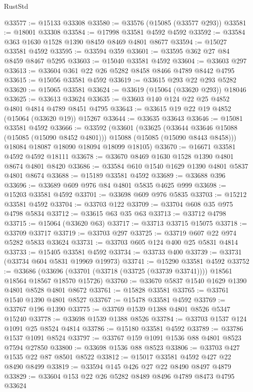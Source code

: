 \begin{lexlean}{RustStd}
\begin{coremodule}
@33577 := @15133 @33308
@33580 := @33576 (@15085 (@33577 @293))
@33581 := @18001 @33308
@33584 := @17998 @33581 @4592 @4592
@33592 := @33584 @363 @1630 @1528 @1390 @8459 @8469 @4801 @8677
@33594 := @15027 @33581 @4592
@33595 := @33594 @359
@33601 := @33595 @362 @27 @84 @8459 @8467 @5295
@33603 := @15040 @33581 @4592
@33604 := @33603 @297
@33613 := @33604 @361 @22 @26 @5282 @8458 @8466 @4789 @8442 @4795
@33615 := @15056 @33581 @4592
@33619 := @33615 @293 @22 @293 @5282
@33620 := @15065 @33581
@33624 := @33619 (@15064 (@33620 @293)) @18046
@33625 := @33613 @33624
@33635 := @33603 @140 @124 @22 @25 @4852 @4801 @4814 @4789 @8451 @4795
@33643 := @33615 @19 @22 @19 @4852 (@15064 (@33620 @19)) @15267
@33644 := @33635 @33643
@33646 := @15081 @33581 @4592
@33666 := @33592
    (@33601
      (@33625
        (@33644 @33646 @15088 (@15085 (@15090 @8452 @4801)))
        @15088
        (@15085 (@15090 @8443 @8458)))
      @18084
      @18087
      @18090
      @18094
      @18099
      @18105)
@33670 := @16671 @33581 @4592 @4592 @18111
@33678 := @33670 @8469 @1630 @1528 @1390 @4801 @8674 @4801 @8420
@33686 := @33584 @610 @1540 @1629 @1390 @4801 @5837 @4801 @8674
@33688 := @15189 @33581 @4592
@33689 := @33688 @396
@33696 := @33689 @609 @976 @84 @4801 @5835 @4625 @999
@33698 := @15203 @33581 @4592
@33701 := @33698 @609 @976 @5835
@33703 := @15212 @33581 @4592
@33704 := @33703 @122
@33709 := @33704 @608 @35 @975 @4798 @5834
@33712 := @33615 @63 @35 @63
@33713 := @33712 @4798
@33715 := @15064 (@33620 @63)
@33717 := @33713 @33715 @15075
@33718 := @33709 @33717
@33719 := @33703 @297
@33725 := @33719 @607 @22 @974 @5282 @5833 @33624
@33731 := @33703 @605 @124 @400 @25 @5831 @4814
@33733 := @15405 @33581 @4592
@33734 := @33733 @400
@33739 := @33731 (@33734 @604 @5831 @19969 @19973)
@33741 := @15290 @33581 @4592
@33752 := @33686
    (@33696 (@33701 (@33718 (@33725 (@33739 @33741)))) @18561 @18564 @18567 @18570 @15726)
@33760 := @33670 @5837 @1540 @1629 @1390 @4801 @8528 @4801 @8672
@33761 := @15828 @33581
@33765 := @33761 @1540 @1390 @4801 @8527
@33767 := @15478 @33581 @4592
@33769 := @33767 @196 @1390
@33775 := @33769 @1539 @1388 @4801 @8526 @5347 @15240
@33778 := @33698 @1539 @1388 @8526
@33784 := @33703 @1537 @124 @1091 @25 @8524 @4814
@33786 := @15180 @33581 @4592
@33789 := @33786 @1537 @1091 @8524
@33797 := @33767 @159 @1091 @1536 @88 @4801 @8523 @7594 @27850
@33800 := @33698 @1536 @88 @8523
@33806 := @33703 @427 @1535 @22 @87 @8501 @8522
@33812 := @15017 @33581 @4592 @427 @22 @8490 @8499
@33819 := @33594 @145 @426 @27 @22 @8490 @8497 @4879
@33829 := @33604 @153 @22 @26 @5282 @8489 @8496 @4789 @8473 @4795 @33624

\end{coremodule}
\end{lexlean}

